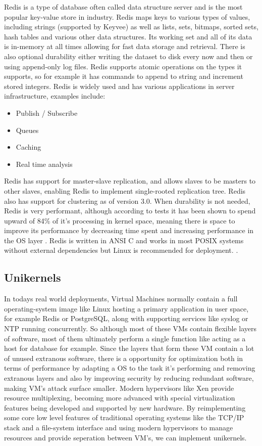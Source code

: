 \documentclass[english,10pt,twocolumn]{article}
\begin{document}
Redis is a type of database often called data structure server and is the most popular key-value store in industry\cite{dbengines}.
Redis maps keys to various types of values, including strings (supported by Keyvee) as well as lists, sets, bitmaps, sorted sets, hash tables and various other data structures.
Its working set and all of its data is in-memory at all times allowing for fast data storage and retrieval.
There is also optional durability either writing the dataset to disk every now and then or using append-only log files.
Redis supports atomic operations on the types it supports, so for example it has commands to append to string and increment stored integers.
Redis is widely used and has various applications in server infrastructure, examples include:

\begin{itemize}
  \item Publish / Subscribe
  \item Queues
  \item Caching
  \item Real time analysis
\end{itemize}

Redis has support for master-slave replication, and allows slaves to be masters to other slaves, enabling Redis to implement single-rooted replication tree.
Redis also has support for clustering as of version 3.0.
When durability is not needed, Redis is very performant, although according to tests it has been shown to spend upward of 84\% of it's processing in kernel space, meaning there is space to improve its performance by decreasing time spent and increasing performance in the OS layer \cite{latency}.
Redis is written in ANSI C and works in most POSIX systems without external dependencies but Linux is recommended for deployment. \cite{redisintroduction}.

\subsection{Unikernels}

In todays real world deployments, Virtual Machines normally contain a full operating-system image like Linux hosting a primary application in user space, for example Redis or PostgreSQL, along with supporting services like syslog or NTP running concurrently.
So although most of these VMs contain flexible layers of software, most of them ultimately perform a single function like acting as a host for database for example.
Since the layers that form these VM contain a lot of unused extranous software, there is a opportunity for optimization both in terms of performance by adapting a OS to the task it's performing and removing extranous layers and also by improving security by reducing redundant software, making VM's attack surface smaller.
Modern hypervisors like Xen provide resource multiplexing, becoming more advanced with special virtualization features being developed and supported by new hardware.
By reimplementing some core low level features of traditional operating systems like the TCP/IP stack and a file-system interface and using modern hypervisors to manage resources and provide seperation between VM's, we can implement unikernels.
\end{document}
